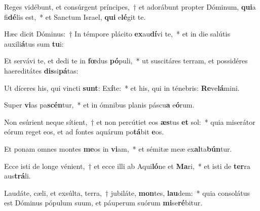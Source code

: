 \item Reges vidébunt, et consúrgent príncipes,~† et adorábunt propter Dóminum, \textbf{qui}a fi\textbf{dé}lis est,~* et Sanctum Israel, \textbf{qui} e\textbf{lé}git te.
\item Hæc dicit Dóminus:~† In témpore plácito \textbf{ex}au\textbf{dí}vi te,~* et in die salútis auxili\textbf{á}tus sum \textbf{tu}i:
\item Et servávi te, et dedi te in \textbf{fœ}dus \textbf{pó}puli,~* ut suscitáres terram, et possidéres haereditátes \textbf{dis}si\textbf{pá}tas:
\item Ut díceres his, qui vincti \textbf{sunt}: Ex\textbf{í}te:~* et his, qui in ténebris: \textbf{Re}ve\textbf{lá}mini.
\item Super \textbf{vi}as pa\textbf{scén}tur,~* et in ómnibus planis páscu\textbf{a} e\textbf{ó}rum.
\item Non esúrient neque sítient,~† et non percútiet eos \textbf{æs}tus \textbf{et} sol:~* quia miserátor eórum reget eos, et ad fontes aquárum po\textbf{tá}bit \textbf{e}os.
\item Et ponam omnes montes \textbf{me}os in \textbf{vi}am,~* et sémitæ meæ ex\textbf{al}ta\textbf{bún}tur.
\item Ecce isti de longe vénient,~† et ecce illi ab Aqui\textbf{ló}ne et \textbf{Ma}ri,~* et isti de \textbf{ter}ra aus\textbf{trá}li.
\item Laudáte, cæli, et exsúlta, terra,~† jubiláte, \textbf{mon}tes, \textbf{lau}dem:~* quia consolátus est Dóminus pópulum suum, et páuperum suórum \textbf{mi}se\textbf{ré}bitur.

